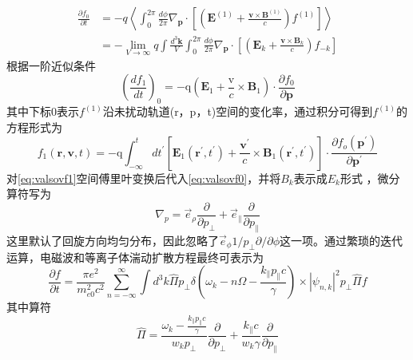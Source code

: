 \begin{equation}\label{eq:valsovf0}
\begin{aligned}
\frac{\partial f_{0}}{\partial t} & = -q\left <\int_{0}^{2 \pi} \frac{d \phi}{2 \pi} \nabla_{\mathbf{p}} \cdot\left[\left(\mathbf{E}^{(1)}+\frac{\mathbf{v} \times \mathbf{B}^{(1)}}{c}\right) f^{(1)}\right]\right> \\
\quad & = -\lim _{V \to \infty} q  \int \frac{d^{3} \mathbf{k}}{V} \int_ {0}^{2 \pi} \frac{d \phi}{2 \pi} \nabla_{\mathbf{p}} \cdot\left[\left(\mathbf{E}_{k}+\frac{\mathbf{v} \times \mathbf{B}_{k}}{c}\right) f_{-k}\right]
\end{aligned}
\end{equation}
根据一阶近似条件
\begin{equation}
\left(\frac{d f_{1}}{d t}\right)_{0}=-\mathrm{q}\left(\mathbf{E}_{1}+\frac{\mathrm{v}}{c} \times \mathbf{B}_{1}\right) \cdot \frac{\partial f_{0}}{\partial \mathbf{p}}
\end{equation}
其中下标0表示$f^{(1)}$沿未扰动轨道(r，p，t)空间的变化率，通过积分可得到$f^{(1)}$的方程形式为
\begin{equation}\label{eq:valsovf1}
f_{1}(\mathbf{r}, \mathbf{v}, t)=-\mathrm{q} \int_{-\infty}^{t} d t^{\prime}\left[\mathbf{E}_{1}\left(\mathbf{r}^{\prime}, t^{\prime}\right)+\frac{\mathbf{v}^{\prime}}{c} \times \mathbf{B}_{1}\left(\mathbf{r}^{\prime}, t^{\prime}\right)\right] \cdot \frac{\partial f_{o}\left(\mathbf{p}^{\prime}\right)}{\partial \mathbf{p}^{\prime}}
\end{equation}
对\autoref{eq:valsovf1}空间傅里叶变换后代入\autoref{eq:valsovf0}，并将$B_k$表示成$E_k$形式 ，微分算符写为
\begin{equation}
\nabla_{p}=\vec{e}_{\rho} \frac{\partial}{\partial p_{\perp}}+\vec{e}_{\|} \frac{\partial}{\partial p_{\|}}
\end{equation}
这里默认了回旋方向均匀分布，因此忽略了$
\vec{ e}_ϕ  1/p_⊥    ∂/∂ϕ$这一项。通过繁琐的迭代运算，电磁波和等离子体湍动扩散方程最终可表示为\cite{RN1757,RN1815,RN1836,RN1829}
\begin{equation}\label{eq:emwdiffuse}
\frac{\partial f}{\partial t}=\frac{\pi e^{2}}{m_{e 0}^{2} c^{2}} \sum_{n=-\infty}^{\infty} \int d^{3} k \widehat{\Pi} p_{\perp} \delta\left(\omega_{k}-n \Omega-\frac{k_{\|} p_{\|} c}{\gamma}\right) \times\left|\psi_{n, k}\right|^{2} p_{\perp} \widehat{\Pi} f
\end{equation}
其中算符
\begin{equation}
\widehat{\Pi}=\frac{\omega_{k}-\frac{k_{\|} p_{\|} c}{\gamma}}{w_{k} p_{\perp}} \frac{\partial}{\partial p_{\perp}}+\frac{k_{\|} c}{w_{k} \gamma} \frac{\partial}{\partial p_{\|}}
\end{equation}
